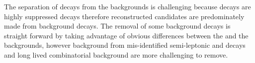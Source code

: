 The separation of \bmumu decays from the backgrounds is challenging because \bmumu decays are highly suppressed decays therefore reconstructed candidates are predominately made from background decays.
The removal of some background decays is straight forward by taking advantage of obvious differences between the \bmumu and the backgrounds, however background from mis-identified semi-leptonic and \bhh decays and long lived combinatorial background are more challenging to remove. %



